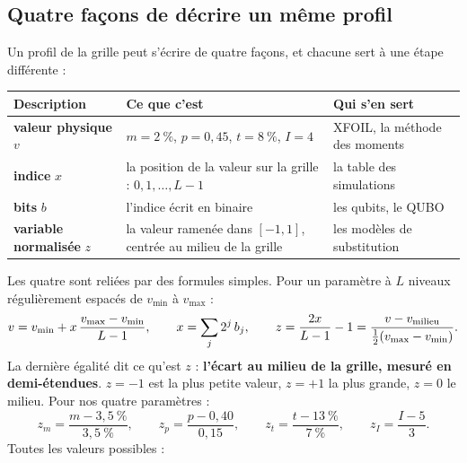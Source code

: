 \subsection{Quatre façons de décrire un même profil}\label{sec:x-b-z}
Un profil de la grille peut s'écrire de quatre façons, et chacune sert à une étape différente :
\begin{center}
\renewcommand{\arraystretch}{1.25}
\begin{tabularx}{\linewidth}{>{\raggedright\arraybackslash}p{3.3cm}>{\raggedright\arraybackslash}X>{\raggedright\arraybackslash}p{3.5cm}}
\toprule
Description & Ce que c'est & Qui s'en sert \\
\midrule
\textbf{valeur physique} $v$ & $m=2~\%$, $p=0{,}45$, $t=8~\%$, $I=4$ & XFOIL, la méthode des moments \\
\textbf{indice} $x$ & la position de la valeur sur la grille : $0,1,\dots,L-1$ & la table des simulations \\
\textbf{bits} $b$ & l'indice écrit en binaire & les qubits, le QUBO \\
\textbf{variable normalisée} $z$ & la valeur ramenée dans $[-1,1]$, centrée au milieu de la grille & les modèles de substitution \\
\bottomrule
\end{tabularx}
\end{center}
Les quatre sont reliées par des formules simples. Pour un paramètre à $L$ niveaux régulièrement espacés de $v_{\min}$ à $v_{\max}$ :
\[ v=v_{\min}+x\,\frac{v_{\max}-v_{\min}}{L-1},\qquad x=\sum_j2^j\,b_j,\qquad z=\frac{2x}{L-1}-1=\frac{v-v_{\rm milieu}}{\tfrac12(v_{\max}-v_{\min})}. \]
La dernière égalité dit ce qu'est $z$ : \textbf{l'écart au milieu de la grille, mesuré en demi-étendues}. $z=-1$ est la plus petite valeur, $z=+1$ la plus grande, $z=0$ le milieu. Pour nos quatre paramètres :
\[ z_m=\frac{m-3{,}5~\%}{3{,}5~\%},\qquad z_p=\frac{p-0{,}40}{0{,}15},\qquad z_t=\frac{t-13~\%}{7~\%},\qquad z_I=\frac{I-5}{3}. \]
Toutes les valeurs possibles :
